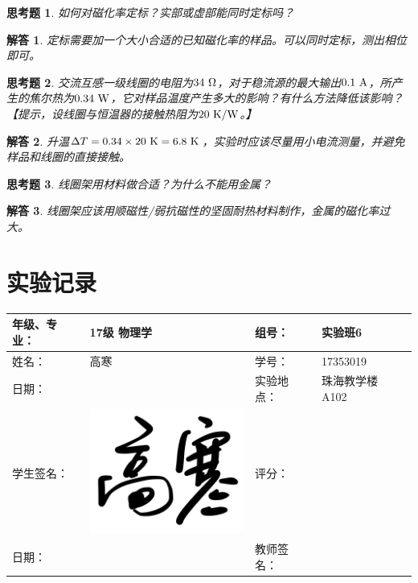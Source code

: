 \documentclass[11pt,a4paper]{ctexart}
\newcommand{\cpic}[2]{
\begin{center}
\texttt{[image: \#2]}
\end{center}
}
\newcommand{\unit}[1]{\rm \ #1}
\newtheorem{que}{思考题}[section]
\newtheorem{ans}{解答}[section]
\begin{document}
\begin{que}
如何对磁化率定标？实部或虚部能同时定标吗？
\end{que}
\begin{ans}
定标需要加一个大小合适的已知磁化率的样品。可以同时定标，测出相位即可。
\end{ans}


\begin{que}
交流互感一级线圈的电阻为$34\unit{\Omega}$，对于稳流源的最大输出$0.1\unit{A}$，所产生的焦尔热为$0.34\unit{W}$，它对样品温度产生多大的影响？有什么方法降低该影响？【提示，设线圈与恒温器的接触热阻为$20\unit{K/W}$。】
\end{que}
\begin{ans}
升温$\Delta T = 0.34\times 20 \unit{K} = 6.8\unit{K}$，实验时应该尽量用小电流测量，并避免样品和线圈的直接接触。
\end{ans}

\begin{que}
线圈架用材料做合适？为什么不能用金属？
\end{que}
\begin{ans}
线圈架应该用顺磁性/弱抗磁性的坚固耐热材料制作，金属的磁化率过大。
\end{ans}














\newpage
\section{实验记录}
\begin{table}[H]
\centering
\begin{tabular}{|p{32mm}|p{32mm}|p{32mm}|p{32mm}|}
\hline
年级、专业： & 17级 物理学 & 组号： & 实验班6 \\ \hline
姓名： & 高寒 & 学号： & 17353019 \\ \hline
日期： &  & 实验地点： & 珠海教学楼 A102 \\ \hline
学生签名： &  \includegraphics[scale=0.09]{sign}& 评分： &  \\ \hline
日期： &  & 教师签名： &  \\ \hline
\end{tabular}
\end{table}
\end{document}
